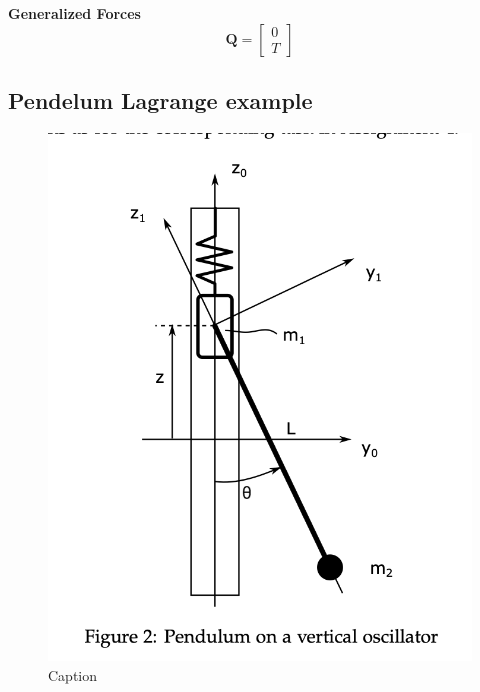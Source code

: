 \textbf{Generalized Forces}
\begin{equation}
\mathbf{Q} = \begin{bmatrix} 0 \\ T \end{bmatrix}
\end{equation}


\subsection{Pendelum Lagrange example}

\begin{figure}[H]
    \centering
    \includegraphics[scale = 0.4]{Skjermbilde 2024-05-24 kl. 14.32.36.png}
    \caption{Caption}
    \label{fig:enter-label}
\end{figure}

